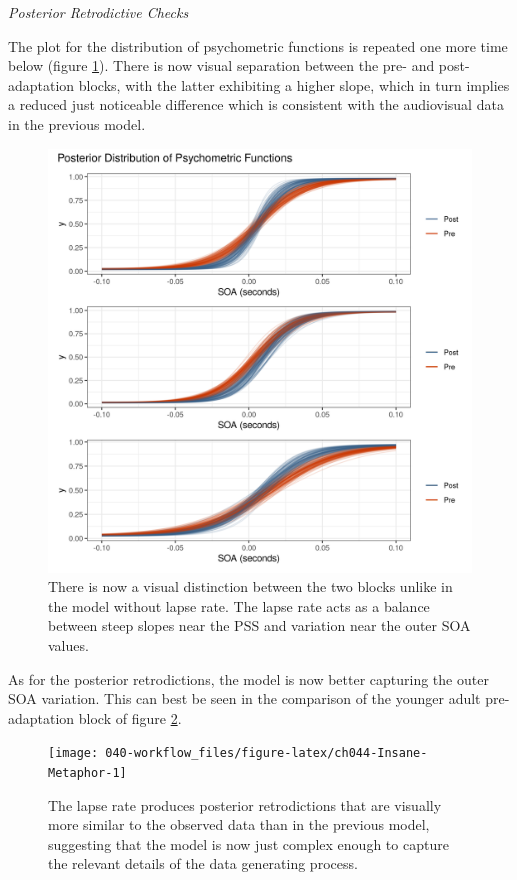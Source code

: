 \documentclass[11pt, oneside, openany]{scrbook}
\begin{document}
\emph{Posterior Retrodictive Checks}

The plot for the distribution of psychometric functions is repeated one more time below (figure \ref{fig:ch044-Screaming-Proton}). There is now visual separation between the pre- and post-adaptation blocks, with the latter exhibiting a higher slope, which in turn implies a reduced just noticeable difference which is consistent with the audiovisual data in the previous model.

\begin{figure}

{\centering \includegraphics[width=0.85\linewidth]{figures/ch044-Screaming-Proton} 

}

\caption{There is now a visual distinction between the two blocks unlike in the model without lapse rate. The lapse rate acts as a balance between steep slopes near the PSS and variation near the outer SOA values.}\label{fig:ch044-Screaming-Proton}
\end{figure}

As for the posterior retrodictions, the model is now better capturing the outer SOA variation. This can best be seen in the comparison of the younger adult pre-adaptation block of figure \ref{fig:ch044-Insane-Metaphor}.

\begin{figure}

{\centering \texttt{[image: 040-workflow\_files/figure-latex/ch044-Insane-Metaphor-1]} 

}

\caption{The lapse rate produces posterior retrodictions that are visually more similar to the observed data than in the previous model, suggesting that the model is now just complex enough to capture the relevant details of the data generating process.}\label{fig:ch044-Insane-Metaphor}
\end{figure}
\end{document}
